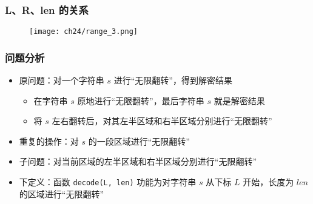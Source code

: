 \begin{frame}[fragile]
    \frametitle{L、R、len 的关系}
    \begin{figure}
        \texttt{[image: ch24/range\_3.png]}
    \end{figure}
\end{frame}

\begin{frame}[fragile]
    \frametitle{问题分析}

    \begin{itemize}
        \item 原问题：对一个字符串 $s$ 进行“无限翻转”，得到解密结果
        \begin{itemize}
            \item 在字符串 $s$ 原地进行“无限翻转”，最后字符串 $s$ 就是解密结果
            \item 将 $s$ 左右翻转后，对其左半区域和右半区域分别进行“无限翻转”
        \end{itemize}
        \item 重复的操作：对 $s$ 的一段区域进行“无限翻转”
        \item 子问题：对当前区域的左半区域和右半区域分别进行“无限翻转”
        \item 下定义：函数 \lstinline|decode(L, len)| 功能为对字符串 $s$ 从下标 $L$ 开始，长度为 $len$ 的区域进行“无限翻转”
    \end{itemize}
\end{frame}

